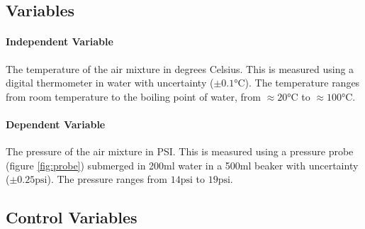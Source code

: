 \documentclass[a4paper,12pt]{article}
\begin{document}
\subsection{Variables}
\paragraph{Independent Variable}
The temperature of the air mixture in degrees Celsius. This is measured using a digital thermometer in water with uncertainty ($\pm 0.1\si{\celsius}$). The temperature ranges from room temperature to the boiling point of water, from $\approx20\si{\celsius}$ to $ \approx100\si{\celsius}$.

\paragraph{Dependent Variable}
The pressure of the air mixture in PSI. This is measured using a pressure probe (figure \ref{fig:probe}) submerged in 200ml water in a 500ml beaker with uncertainty ($\pm 0.25\text{psi}$). The pressure ranges from $14\text{psi}$ to $19\text{psi}$.

\subsection{Control Variables}
\end{document}
